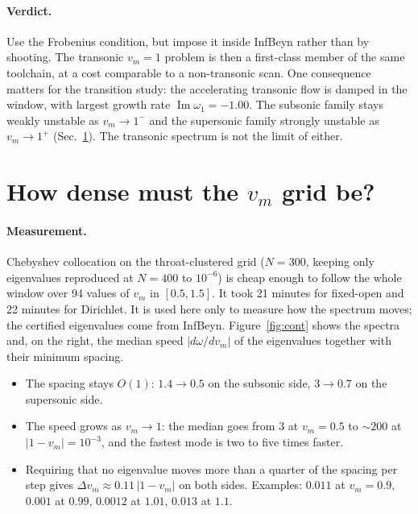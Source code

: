 \documentclass[11pt]{article}
\newcommand{\Imag}{\operatorname{Im}}
\newcommand{\infbeyn}{InfBeyn}
\begin{document}
\paragraph{Verdict.} Use the Frobenius condition, but impose it inside \infbeyn{} rather than by shooting.
The transonic $v_m=1$ problem is then a first-class member of the same toolchain, at a cost comparable to a
non-transonic scan. One consequence matters for the transition study: the accelerating transonic flow is
damped in the window, with largest growth rate $\Imag\omega_1=-1.00$. The subsonic family stays weakly unstable
as $v_m\to1^-$ and the supersonic family strongly unstable as $v_m\to1^+$ (Sec.~\ref{sec:grid}). The transonic
spectrum is not the limit of either.

\section{How dense must the $v_m$ grid be?}\label{sec:grid}

\paragraph{Measurement.} Chebyshev collocation on the throat-clustered grid ($N=300$, keeping only eigenvalues
reproduced at $N=400$ to $10^{-6}$) is cheap enough to follow the whole window over 94 values of $v_m$ in
$[0.5,1.5]$. It took 21 minutes for fixed-open and 22 minutes for Dirichlet. It is used here only to measure
how the spectrum moves; the certified eigenvalues come from \infbeyn{}. Figure~\ref{fig:cont} shows the
spectra and, on the right, the median speed $|d\omega/dv_m|$ of the eigenvalues together with their minimum
spacing.

\begin{itemize}
  \item The spacing stays $O(1)$: $1.4\to0.5$ on the subsonic side, $3\to0.7$ on the supersonic side.
  \item The speed grows as $v_m\to1$: the median goes from $3$ at $v_m=0.5$ to $\sim200$ at $|1-v_m|=10^{-3}$,
  and the fastest mode is two to five times faster.
  \item Requiring that no eigenvalue moves more than a quarter of the spacing per step gives
  $\Delta v_m\approx0.11\,|1-v_m|$ on both sides. Examples: $0.011$ at $v_m=0.9$, $0.001$ at $0.99$,
  $0.0012$ at $1.01$, $0.013$ at $1.1$.
\end{itemize}
\end{document}
